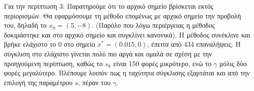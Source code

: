 \begin{figure}[H]
    \centering
    \hfill
\end{figure}
Για την περίπτωση 3:\newline
Παρατηρούμε ότι το αρχικό σημείο βρίσκεται εκτός περιορισμών. Θα εφαρμόσουμε τη μέθοδο επομένως με αρχικό σημείο την προβολή του, δηλαδή το $x_0 = (5, -8)$. (Παρόλο που λόγω περιέργειας η μέθοδος δοκιμάστηκε και στο αρχικό σημείο και συγκλίνει κανονικά). H μέθοδος συνέκλινε και βρήκε ελάχιστο το $0$ στο σημείο $x^* = (0.015, 0)$, έπειτα από 434 επαναλήψεις. Η σύγκλιση στο ελάχιστο γίνεται πολύ πιο αργά και ομαλά σε σχέση με την προηγούμενη περίπτωση, καθώς το $s_k$ είναι 150 φορές μικρότερο, ενώ το $\gamma$ μόλις δύο φορές μεγαλύτερο. Βλέπουμε λοιπόν πως η ταχύτητα σύγκλισης εξαρτάται και από την επιλογή της παραμέτρου $s$, πέραν του $\gamma$.
\begin{figure}[!h]
    \centering
    \hfill
\end{figure}